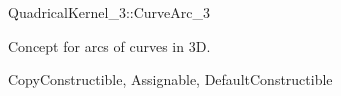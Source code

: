 \begin{ccRefConcept}{QuadricalKernel_3::CurveArc_3}

Concept for arcs of curves in 3D.

\ccRefines
CopyConstructible, Assignable, DefaultConstructible

\ccHasModels
{}


\end{ccRefConcept}
